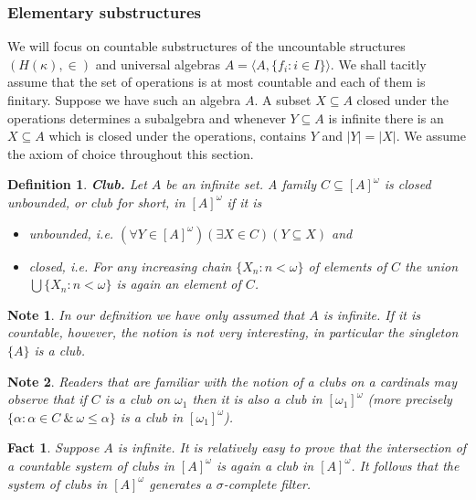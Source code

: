 \documentclass[a4paper,11pt,oneside]{mybook}
\theoremstyle{theorem}
\newtheorem{fact}[subsection]{Fact}
\newtheorem{definition}[subsection]{Definition}
\theoremstyle{example}
\newtheorem*{note}{Note}
\begin{document}
{\subsubsection{Elementary substructures}

We will focus on countable substructures of the uncountable structures $(H(\kappa),\in)$ and universal algebras
$A=\langle A,\{f_i:i\in I\}\rangle$. We shall tacitly assume that the set of operations is at most
countable and each of them is finitary. Suppose we have such an algebra $A$. A subset $X\subseteq A$ closed under the
operations determines a subalgebra and whenever $Y\subseteq A$ is infinite there is an $X\subseteq A$ which is closed under the operations,
contains $Y$ and $|Y|=|X|$. We assume the axiom of choice throughout this section.

\begin{definition}\label{club}
{\bf Club.} Let $A$ be an infinite set. A family $C\subseteq[A]^{\omega}$ is \emph{closed unbounded}, or \emph{club}
for short, in $[A]^\omega$ if it is
\begin{itemize}
  \item[(i)] \emph{unbounded,} i.e.
	$(\forall Y\in[A]^\omega)(\exists X\in C)(Y\subseteq X)$ and
  \item[(ii)] \emph{closed,} i.e.
	For any increasing chain $\{X_n:n<\omega\}$ of elements of
	$C$ the union $\bigcup\{X_n:n<\omega\}$ is again an element of $C$.
\end{itemize}
\end{definition}

\begin{note} In our definition we have only assumed that $A$ is infinite. If it is countable, however, the notion is not very interesting, in particular
the singleton $\{A\}$ is a club.
\end{note}

\begin{note} Readers that are familiar with the notion of a clubs on a cardinals may observe that if $C$ is a club on $\omega_1$ then
it is also a club in $[\omega_1]^{\omega}$ (more precisely $\{\alpha:\alpha\in C\ \&\ \omega\leq\alpha\}$ is a club in $[\omega_1]^{\omega}$).
\end{note}

\begin{fact}
Suppose $A$ is infinite. It is relatively easy to prove that the intersection of a countable system of clubs in $[A]^{\omega}$ is again
a club in $[A]^{\omega}$. It follows that the system of clubs in $[A]^{\omega}$ generates a $\sigma$-complete filter.
\end{fact}
%

}
\end{document}
